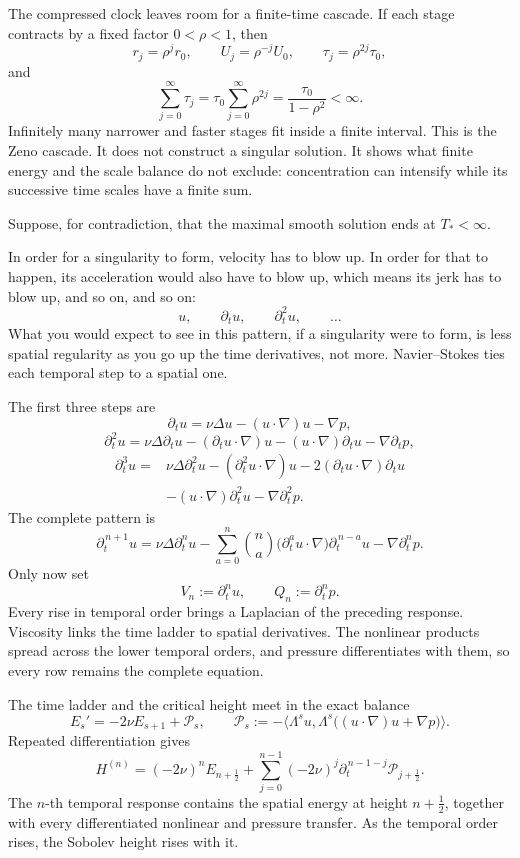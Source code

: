 \documentclass[11pt]{article}
\begin{document}
The compressed clock leaves room for a finite-time cascade. If each stage contracts by a fixed factor \(0<\rho<1\), then
\[
r_j=\rho^jr_0,
\qquad
U_j=\rho^{-j}U_0,
\qquad
\tau_j=\rho^{2j}\tau_0,
\]
and
\[
\sum_{j=0}^{\infty}\tau_j
=\tau_0\sum_{j=0}^{\infty}\rho^{2j}
=\frac{\tau_0}{1-\rho^2}<\infty.
\]
Infinitely many narrower and faster stages fit inside a finite interval. This is the Zeno cascade. It does not construct a singular solution. It shows what finite energy and the scale balance do not exclude: concentration can intensify while its successive time scales have a finite sum.

Suppose, for contradiction, that the maximal smooth solution ends at \(T_*<\infty\).

In order for a singularity to form, velocity has to blow up. In order for that to happen, its acceleration would also have to blow up, which means its jerk has to blow up, and so on, and so on:
\[
u,\qquad \partial_tu,\qquad \partial_t^2u,\qquad \ldots
\]
What you would expect to see in this pattern, if a singularity were to form, is less spatial regularity as you go up the time derivatives, not more. Navier--Stokes ties each temporal step to a spatial one.

The first three steps are
\[
\partial_tu
=\nu\Delta u-(u\cdot\nabla)u-\nabla p,
\]
\[
\partial_t^2u
=\nu\Delta\partial_tu
-(\partial_tu\cdot\nabla)u
-(u\cdot\nabla)\partial_tu
-\nabla\partial_tp,
\]
\[
\begin{aligned}
\partial_t^3u={}&\nu\Delta\partial_t^2u
-(\partial_t^2u\cdot\nabla)u
-2(\partial_tu\cdot\nabla)\partial_tu \\
&-(u\cdot\nabla)\partial_t^2u
-\nabla\partial_t^2p.
\end{aligned}
\]
The complete pattern is
\[
\partial_t^{\,n+1}u
=\nu\Delta\partial_t^nu
-\sum_{a=0}^{n}\binom na
\bigl(\partial_t^au\cdot\nabla\bigr)\partial_t^{\,n-a}u
-\nabla\partial_t^np.
\]
Only now set
\[
V_n:=\partial_t^nu,
\qquad
Q_n:=\partial_t^np.
\]
Every rise in temporal order brings a Laplacian of the preceding response. Viscosity links the time ladder to spatial derivatives. The nonlinear products spread across the lower temporal orders, and pressure differentiates with them, so every row remains the complete equation.

The time ladder and the critical height meet in the exact balance
\[
E_s'=-2\nu E_{s+1}+\mathcal P_s,
\qquad
\mathcal P_s
:=-\bigl\langle\Lambda^su,
\Lambda^s\bigl((u\cdot\nabla)u+\nabla p\bigr)\bigr\rangle.
\]
Repeated differentiation gives
\[
H^{(n)}
=(-2\nu)^nE_{n+\frac12}
+\sum_{j=0}^{n-1}(-2\nu)^j
\partial_t^{\,n-1-j}\mathcal P_{j+\frac12}.
\]
The \(n\)-th temporal response contains the spatial energy at height \(n+\tfrac12\), together with every differentiated nonlinear and pressure transfer. As the temporal order rises, the Sobolev height rises with it.
\end{document}
